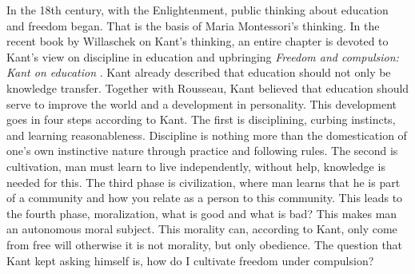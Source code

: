 \documentclass[12pt, a4paper]{article}
\begin{document}
In the 18th century, with the Enlightenment, public thinking about education and freedom began. That is the basis of Maria Montessori’s thinking. In the recent book by Willaschek on Kant’s thinking, an entire chapter is devoted to Kant’s view on discipline in education and upbringing \emph{Freedom and compulsion: Kant on education} \cite[p. 67-78]{willaschek}. Kant already described that education should not only be knowledge transfer. Together with Rousseau, Kant believed that education should serve to improve the world and a development in personality. This development goes in four steps according to Kant. The first is disciplining, curbing instincts, and learning reasonableness. Discipline is nothing more than the domestication of one’s own instinctive nature through practice and following rules. The second is cultivation, man must learn to live independently, without help, knowledge is needed for this. The third phase is civilization, where man learns that he is part of a community and how you relate as a person to this community. This leads to the fourth phase, moralization, what is good and what is bad? This makes man an autonomous moral subject. This morality can, according to Kant, only come from free will otherwise it is not morality, but only obedience. The question that Kant kept asking himself is, how do I cultivate freedom under compulsion? \cite[p. 70-71]{willaschek}
\end{document}
